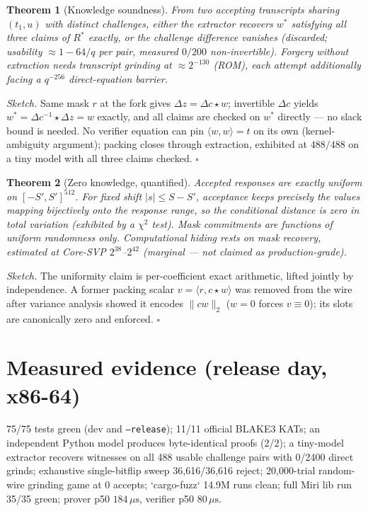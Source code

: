 \documentclass[11pt,a4paper]{article}
\newtheorem{theorem}{Theorem}[section]
\theoremstyle{remark}
\begin{document}
\begin{theorem}[Knowledge soundness]
From two accepting transcripts sharing $(t_1,u)$ with distinct challenges,
either the extractor recovers $w^*$ satisfying all three claims of $R^*$
exactly, or the challenge difference vanishes (discarded; usability
$\approx 1-64/q$ per pair, measured $0/200$ non-invertible). Forgery
without extraction needs transcript grinding at $\approx 2^{-130}$ (ROM),
each attempt additionally facing a $q^{-256}$ direct-equation barrier.
\end{theorem}
\noindent\textit{Sketch.} Same mask $r$ at the fork gives
$\Delta z = \Delta c\star w$; invertible $\Delta c$ yields
$w^* = \Delta c^{-1}\star\Delta z = w$ exactly, and all claims are checked
on $w^*$ directly — no slack bound is needed. No verifier equation can pin
$\langle w,w\rangle = t$ on its own (kernel-ambiguity argument); packing
closes through extraction, exhibited at $488/488$ on a tiny model with
all three claims checked. \hfill $\square$

\begin{theorem}[Zero knowledge, quantified]
Accepted responses are exactly uniform on $[-S',S']^{512}$.
For fixed shift $|s| \le S-S'$, acceptance keeps precisely the values
mapping bijectively onto the response range, so the conditional distance
is zero in total variation (exhibited by a $\chi^2$ test).
Mask commitments are
functions of uniform randomness only. Computational hiding rests on mask
recovery, estimated at Core-SVP $2^{38}$--$2^{42}$ (marginal — not claimed
as production-grade).
\end{theorem}
\noindent\textit{Sketch.} The uniformity claim is per-coefficient exact
arithmetic, lifted jointly by independence. A former packing scalar
$v = \langle r,c\star w\rangle$ was removed from the wire after variance
analysis showed it encodes $\lVert cw\rVert_2$ ($w=0$ forces $v\equiv0$);
its slots are canonically zero and enforced. \hfill $\square$

\section{Measured evidence (release day, x86-64)}

75/75 tests green (dev and \texttt{--release}); 11/11 official BLAKE3
KATs; an independent Python model produces byte-identical proofs (2/2);
a tiny-model extractor recovers witnesses on all 488 usable challenge
pairs with 0/2400 direct grinds; exhaustive single-bitflip sweep
36,616/36,616 reject; 20,000-trial random-wire grinding game at 0 accepts;
`cargo-fuzz` 14.9M runs clean; full Miri lib run 35/35 green; prover
p50 $184\,\mu\mathrm{s}$, verifier p50 $80\,\mu\mathrm{s}$.
\end{document}
